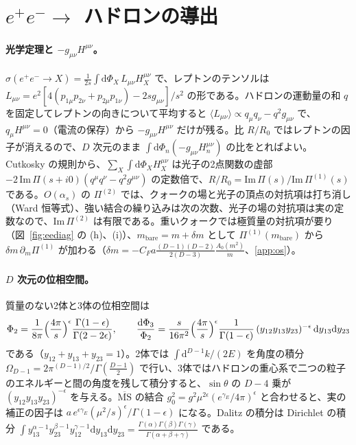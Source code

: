 \documentclass[a4paper,10pt]{ltjsarticle}
\newcommand{\dd}{\mathrm{d}}
\newcommand{\MSbar}{\overline{\mathrm{MS}}}
\begin{document}
\section{\texorpdfstring{$e^+e^-\to$}{e+e- →} ハドロンの導出}\label{app:ee}

\paragraph{光学定理と $-g_{\mu\nu}H^{\mu\nu}$。}$\sigma(e^+e^-\to X)=\frac1{2s}\int\dd\Phi_X\,L_{\mu\nu}H^{\mu\nu}_X$ で、レプトンのテンソルは $L_{\mu\nu}=e^2[4(p_{1\mu}p_{2\nu}+p_{2\mu}p_{1\nu})-2sg_{\mu\nu}]/s^2$ の形である。ハドロンの運動量の和 $q$ を固定してレプトンの向きについて平均すると $\langle L_{\mu\nu}\rangle\propto q_\mu q_\nu-q^2g_{\mu\nu}$ で、$q_\mu H^{\mu\nu}=0$（電流の保存）から $-g_{\mu\nu}H^{\mu\nu}$ だけが残る。比 $R/R_0$ ではレプトンの因子が消えるので、$D$ 次元のまま $\int\dd\Phi_n(-g_{\mu\nu}H^{\mu\nu}_n)$ の比をとればよい。Cutkosky の規則から、$\sum_X\int\dd\Phi_X H^{\mu\nu}_X$ は光子の2点関数の虚部 $-2\,\mathrm{Im}\,\Pi(s+i0)(q^\mu q^\nu-q^2g^{\mu\nu})$ の定数倍で、$R/R_0=\mathrm{Im}\,\Pi(s)/\mathrm{Im}\,\Pi^{(1)}(s)$ である。$O(\alpha_s)$ の $\Pi^{(2)}$ では、クォークの場と光子の頂点の対抗項は打ち消し（Ward 恒等式）、強い結合の繰り込みは次の次数、光子の場の対抗項は実の定数なので、$\mathrm{Im}\,\Pi^{(2)}$ は有限である。重いクォークでは極質量の対抗項が要り（図~\ref{fig:eediag} の (h)、(i)）、$m_{\mathrm{bare}}=m+\delta m$ として $\Pi^{(1)}(m_{\mathrm{bare}})$ から $\delta m\,\partial_m\Pi^{(1)}$ が加わる（$\delta m=-C_Fa\frac{(D-1)(D-2)}{2(D-3)}\frac{A_0(m^2)}m$、\ref{app:os}）。

\paragraph{$D$ 次元の位相空間。}質量のない2体と3体の位相空間は
\begin{equation*}
\Phi_2=\frac1{8\pi}\Bigl(\frac{4\pi}{s}\Bigr)^\epsilon\frac{\Gamma(1-\epsilon)}{\Gamma(2-2\epsilon)},\qquad
\frac{\dd\Phi_3}{\Phi_2}=\frac{s}{16\pi^2}\Bigl(\frac{4\pi}s\Bigr)^\epsilon\frac{1}{\Gamma(1-\epsilon)}\,(y_{12}y_{13}y_{23})^{-\epsilon}\,\dd y_{13}\dd y_{23}
\end{equation*}
である（$y_{12}+y_{13}+y_{23}=1$）。2体では $\int\dd^{D-1}k/(2E)$ を角度の積分 $\Omega_{D-1}=2\pi^{(D-1)/2}/\Gamma(\frac{D-1}2)$ で行い、3体ではハドロンの重心系で二つの粒子のエネルギーと間の角度を残して積分すると、$\sin\theta$ の $D-4$ 乗が $(y_{12}y_{13}y_{23})^{-\epsilon}$ を与える。$\MSbar$ の結合 $g_0^2=g^2\mu^{2\epsilon}(e^{\gamma_E}/4\pi)^\epsilon$ と合わせると、実の補正の因子は $a\,e^{\epsilon\gamma_E}(\mu^2/s)^\epsilon/\Gamma(1-\epsilon)$ になる。Dalitz の積分は Dirichlet の積分 $\int y_{13}^{\alpha-1}y_{23}^{\beta-1}y_{12}^{\gamma-1}\dd y_{13}\dd y_{23}=\frac{\Gamma(\alpha)\Gamma(\beta)\Gamma(\gamma)}{\Gamma(\alpha+\beta+\gamma)}$ である。
\end{document}
